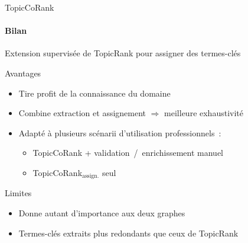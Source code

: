 \begin{frame}{TopicCoRank}\framesubtitle{Bilan}
  Extension supervisée de TopicRank pour assigner des termes-clés

  \vspace{1em}

  \begin{block}{Avantages}
    \begin{itemize}
      \item{Tire profit de la connaissance du domaine}
      \item{Combine extraction et assignement $\Rightarrow$ meilleure
            exhaustivité}
      \item{Adapté à plusieurs scénarii d'utilisation professionnels~:}
      \begin{itemize}
        \item{TopicCoRank + validation~/~enrichissement manuel}
        \item{TopicCoRank$_\text{assign.}$ seul}
      \end{itemize}
    \end{itemize}
  \end{block}

  \vspace{1em}

  \begin{alertblock}{Limites}
    \begin{itemize}
      \item{Donne autant d'importance aux deux graphes}
      \item{Termes-clés extraits plus redondants que ceux de TopicRank}
    \end{itemize}
  \end{alertblock}
\end{frame}

